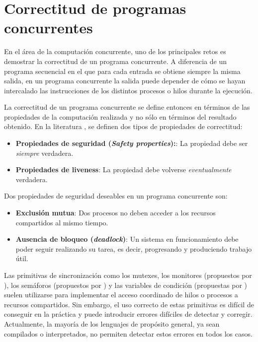 \section{Correctitud de programas concurrentes}

En el área de la computación concurrente, uno de los principales retos es demostrar la
correctitud de un programa concurrente. A diferencia de un programa secuencial en el que para
cada entrada se obtiene siempre la misma salida, en un programa concurrente la salida puede
depender de cómo se hayan intercalado las instrucciones de los distintos procesos o hilos
durante la ejecución.

La correctitud de un programa concurrente se define entonces en términos de las propiedades
de la computación realizada y no sólo en términos del resultado obtenido.
En la literatura \cite{ben-ari2006,coulouris2012,tanenbaum2017}, se definen dos tipos de
propiedades de correctitud:

\begin{itemize}
    \item \textbf{Propiedades de seguridad (\emph{Safety properties}):}: La propiedad debe ser \emph{siempre} verdadera.
    \item \textbf{Propiedades de liveness}: La propiedad debe volverse \emph{eventualmente} verdadera.
\end{itemize}

Dos propiedades de seguridad deseables en un programa concurrente son:

\begin{itemize}
    \item \textbf{Exclusión mutua}: Dos procesos no deben acceder a los recursos compartidos al mismo tiempo.
    \item \textbf{Ausencia de bloqueo (\emph{deadlock})}: Un sistema en funcionamiento debe poder seguir realizando
          su tarea, es decir, progresando y produciendo trabajo útil.
\end{itemize}

Las primitivas de sincronización como los mutexes, los monitores
(propuestos por \cite{hansen1972structured,hansen1973operating}),
los semáforos (propuestos por \cite{Dijkstra2002}) y las variables de
condición (propuestas por \cite{hoare1974monitors}) suelen utilizarse para implementar el acceso
coordinado de hilos o procesos a recursos compartidos. Sin embargo, el uso correcto de estas
primitivas es difícil de conseguir en la práctica y puede introducir errores difíciles de detectar y
corregir. Actualmente, la mayoría de los lenguajes de propósito general, ya sean compilados o
interpretados, no permiten detectar estos errores en todos los casos.

